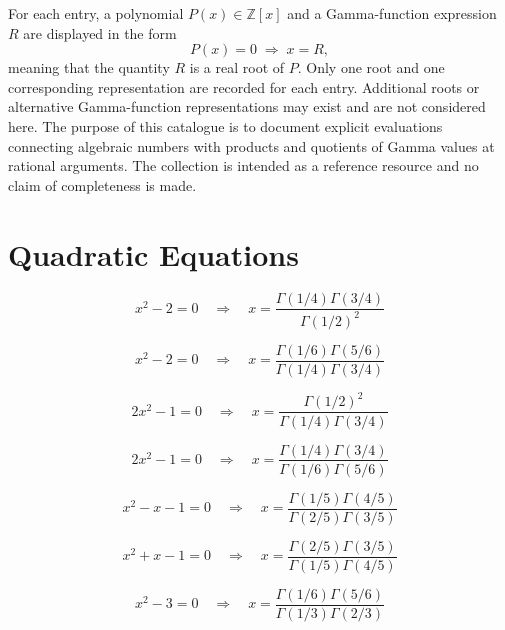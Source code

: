 \documentclass[11pt,a4paper]{article}
\begin{document}
For each entry, a polynomial \(P(x)\in\mathbb{Z}[x]\) and a Gamma-function expression \(R\) are displayed in the form \[ P(x)=0 \;\Longrightarrow\; x = R, \] meaning that the quantity \(R\) is a real root of \(P\). Only one root and one corresponding representation are recorded for each entry. Additional roots or alternative Gamma-function representations may exist and are not considered here. The purpose of this catalogue is to document explicit evaluations connecting algebraic numbers with products and quotients of Gamma values at rational arguments. The collection is intended as a reference resource and no claim of completeness is made.

\section{Quadratic Equations}

\begin{equation}\label{eq:1}
x^{2} - 2 = 0 \quad \Rightarrow \quad x = \frac{\Gamma(1/4)\Gamma(3/4)}{\Gamma(1/2)^2}
\end{equation}

\begin{equation}\label{eq:2}
x^{2} - 2 = 0 \quad \Rightarrow \quad x = \frac{\Gamma(1/6)\Gamma(5/6)}{\Gamma(1/4)\Gamma(3/4)}
\end{equation}

\begin{equation}\label{eq:3}
2x^{2} - 1 = 0 \quad \Rightarrow \quad x = \frac{\Gamma(1/2)^2}{\Gamma(1/4)\Gamma(3/4)}
\end{equation}

\begin{equation}\label{eq:4}
2x^{2} - 1 = 0 \quad \Rightarrow \quad x = \frac{\Gamma(1/4)\Gamma(3/4)}{\Gamma(1/6)\Gamma(5/6)}
\end{equation}

\begin{equation}\label{eq:5}
x^{2} - x - 1 = 0 \quad \Rightarrow \quad x = \frac{\Gamma(1/5)\Gamma(4/5)}{\Gamma(2/5)\Gamma(3/5)}
\end{equation}

\begin{equation}\label{eq:6}
x^{2} + x - 1 = 0 \quad \Rightarrow \quad x = \frac{\Gamma(2/5)\Gamma(3/5)}{\Gamma(1/5)\Gamma(4/5)}
\end{equation}

\begin{equation}\label{eq:7}
x^{2} - 3 = 0 \quad \Rightarrow \quad x = \frac{\Gamma(1/6)\Gamma(5/6)}{\Gamma(1/3)\Gamma(2/3)}
\end{equation}
\end{document}
